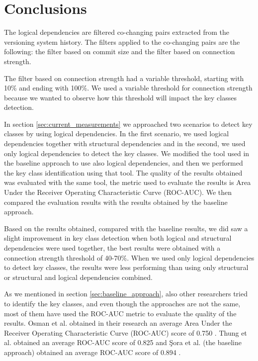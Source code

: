\documentclass[runningheads]{comsis2}
\begin{document}
\section{Conclusions}
\label{sec:conclusion}


The logical dependencies are filtered co-changing pairs extracted from the versioning system history. The filters applied to the co-changing pairs are the following: the filter based on commit size and the filter based on connection strength.

The filter based on connection strength had a variable threshold, starting with 10\% and ending with 100\%. We used a variable threshold for connection strength because we wanted to observe how this threshold will impact the key classes detection.

In section \ref{sec:current_measurements} we approached two scenarios to detect key classes by using logical dependencies. In the first scenario, we used logical dependencies together with structural dependencies and in the second, we used only logical dependencies to detect the key classes. We modified the tool used in the baseline approach to use also logical dependencies, and then we performed the key class identification using that tool. 
The quality of the results obtained was evaluated with the same tool, the metric used to evaluate the results is Area Under the Receiver Operating Characteristic Curve (ROC-AUC). We then compared the evaluation results with the results obtained by the baseline approach. 

Based on the results obtained, compared with the baseline results, we did saw a slight improvement in key class detection when both logical and structural dependencies were used together, the best results were obtained with a connection strength threshold of 40-70\%. When we used only logical dependencies to detect key classes, the results were less performing than using only structural or structural and logical dependencies combined.

As we mentioned in section \ref{sec:baseline_approach}, also other researchers tried to identify the key classes, and even though the approaches are not the same, most of them have used the ROC-AUC metric to evaluate the quality of the results. 
Osman et al. obtained in their research an average Area Under the Receiver Operating Characteristic Curve (ROC-AUC) score of 0.750 \cite{6676885}. Thung et al. obtained an average ROC-AUC score of 0.825 \cite{rocclasification}  and Şora et al. (the baseline approach) obtained an average ROC-AUC score of 0.894 \cite{Finding-key-classes}.
\end{document}
